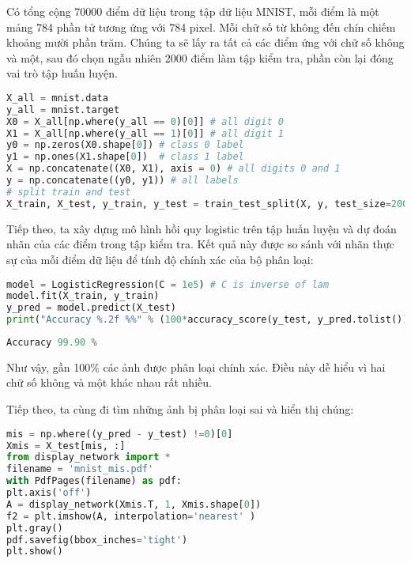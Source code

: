 Có tổng cộng 70000 điểm dữ liệu trong tập dữ liệu MNIST, mỗi điểm là một mảng
784 phần tử tương ứng với 784 pixel. Mỗi chữ số từ không đến chín chiếm khoảng
mười phần trăm. Chúng ta sẽ lấy ra tất cả các điểm ứng với chữ số không và một,
sau đó chọn ngẫu nhiên 2000 điểm làm tập kiểm tra, phần còn lại đóng vai trò
tập huấn luyện.
\begin{lstlisting}[language=Python]
X_all = mnist.data
y_all = mnist.target
X0 = X_all[np.where(y_all == 0)[0]] # all digit 0
X1 = X_all[np.where(y_all == 1)[0]] # all digit 1
y0 = np.zeros(X0.shape[0]) # class 0 label
y1 = np.ones(X1.shape[0])  # class 1 label
X = np.concatenate((X0, X1), axis = 0) # all digits 0 and 1
y = np.concatenate((y0, y1)) # all labels
# split train and test
X_train, X_test, y_train, y_test = train_test_split(X, y, test_size=2000)
\end{lstlisting}

Tiếp theo, ta xây dựng mô hình hồi quy logistic trên tập huấn luyện và dự
đoán nhãn của các điểm trong tập kiểm tra. Kết quả này được so sánh với nhãn
thực sự của mỗi điểm dữ liệu để tính độ chính xác của bộ phân loại:
\begin{lstlisting}[language=Python]
model = LogisticRegression(C = 1e5) # C is inverse of lam
model.fit(X_train, y_train)
y_pred = model.predict(X_test)
print("Accuracy %.2f %%" % (100*accuracy_score(y_test, y_pred.tolist())))
\end{lstlisting}
\kq
\begin{lstlisting}[language=Python]
Accuracy 99.90 %
\end{lstlisting}
Như vậy, gần 100\% các ảnh được phân loại chính xác. Điều này dễ hiểu vì hai
chữ số không và một khác nhau rất nhiều.

Tiếp theo, ta cùng đi tìm những ảnh bị phân loại sai và hiển thị chúng:
\begin{lstlisting}[language=Python]
mis = np.where((y_pred - y_test) !=0)[0]
Xmis = X_test[mis, :]
from display_network import *
filename = 'mnist_mis.pdf'
with PdfPages(filename) as pdf:
plt.axis('off')
A = display_network(Xmis.T, 1, Xmis.shape[0])
f2 = plt.imshow(A, interpolation='nearest' )
plt.gray()
pdf.savefig(bbox_inches='tight')
plt.show()
\end{lstlisting}

